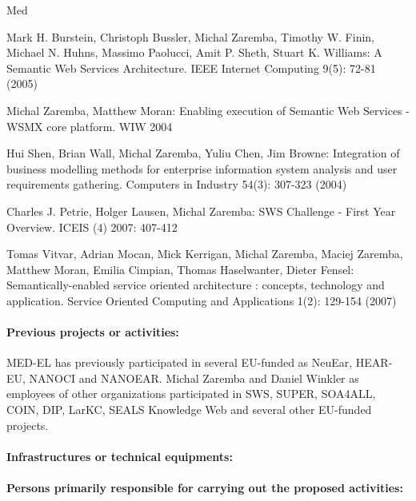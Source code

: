 \begin{sitedescription}{Med}
\begin{compactitem}
\item Mark H. Burstein, Christoph Bussler, Michal Zaremba, Timothy W. Finin, Michael N. Huhns, Massimo Paolucci, Amit P. Sheth, Stuart K. Williams:
A Semantic Web Services Architecture. IEEE Internet Computing 9(5): 72-81 (2005)
\item Michal Zaremba, Matthew Moran: Enabling execution of Semantic Web Services - WSMX core platform. WIW 2004
\item Hui Shen, Brian Wall, Michal Zaremba, Yuliu Chen, Jim Browne: Integration of business modelling methods for enterprise information system analysis and user requirements gathering. Computers in Industry 54(3): 307-323 (2004)
\item Charles J. Petrie, Holger Lausen, Michal Zaremba: SWS Challenge - First Year Overview. ICEIS (4) 2007: 407-412
\item Tomas Vitvar, Adrian Mocan, Mick Kerrigan, Michal Zaremba, Maciej Zaremba, Matthew Moran, Emilia Cimpian, Thomas Haselwanter, Dieter Fensel: Semantically-enabled service oriented architecture : concepts, technology and application. Service Oriented Computing and Applications 1(2): 129-154 (2007)
\end{compactitem}

\paragraph*{Previous projects or activities:}


MED-EL has previously participated in several EU-funded as NeuEar, HEAR-EU, NANOCI and NANOEAR. Michal Zaremba and Daniel Winkler as employees of other organizations participated in SWS, SUPER, SOA4ALL, COIN, DIP, LarKC, SEALS Knowledge Web and several other EU-funded projects.

\paragraph*{Infrastructures or technical equipments:}


\paragraph*{Persons primarily responsible for carrying out the proposed activities:}


\end{sitedescription}
